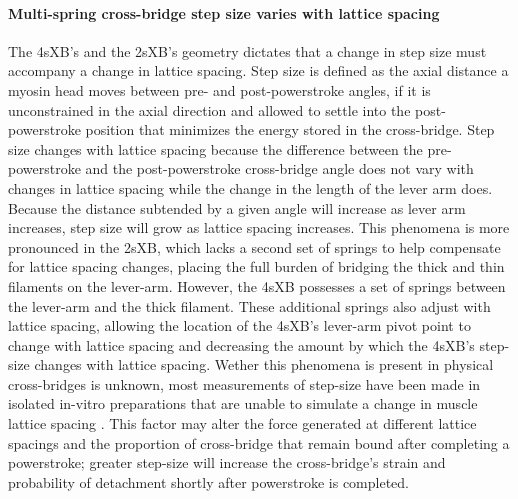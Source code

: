 \documentclass[]{article}
\begin{document}
\paragraph{Multi-spring cross-bridge step size varies with lattice spacing} %
The 4sXB's and the 2sXB's geometry dictates that a change in step size must accompany a change in lattice spacing. 
Step size is defined as the axial distance a myosin head moves between pre- and post-powerstroke angles, if it is unconstrained in the axial direction and allowed to settle into the post-powerstroke position that minimizes the energy stored in the cross-bridge.
Step size changes with lattice spacing because the difference between the pre-powerstroke and the post-powerstroke cross-bridge angle does not vary with changes in lattice spacing while the change in the length of the lever arm does. 
Because the distance subtended by a given angle will increase as lever arm increases, step size will grow as lattice spacing increases. 
This phenomena is more pronounced in the 2sXB, which lacks a second set of springs to help compensate for lattice spacing changes, placing the full burden of bridging the thick and thin filaments on the lever-arm. 
However, the 4sXB possesses a set of springs between the lever-arm and the thick filament.
These additional springs also adjust with lattice spacing, allowing the location of the 4sXB's lever-arm pivot point to change with lattice spacing and decreasing the amount by which the 4sXB's step-size changes with lattice spacing.  
Wether this phenomena is present in physical cross-bridges is unknown, most measurements of step-size have been made in isolated in-vitro preparations that are unable to simulate a change in muscle lattice spacing \citep{HowardBook, Peterman2004}.  
This factor may alter the force generated at different lattice spacings and the proportion of cross-bridge that remain bound after completing a powerstroke; greater step-size will increase the cross-bridge's strain and probability of detachment shortly after powerstroke is completed. 
\end{document}
